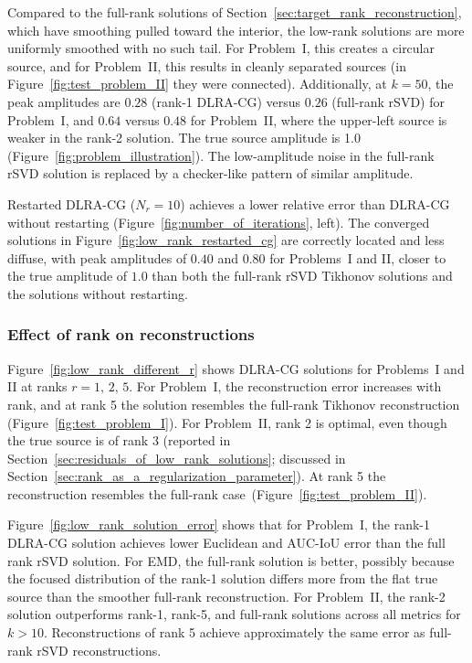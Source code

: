 Compared to the full-rank solutions of Section~\ref{sec:target_rank_reconstruction}, which have smoothing pulled toward the interior, the low-rank solutions are more uniformly smoothed with no such tail. For Problem~I, this creates a circular source, and for Problem~II, this results in cleanly separated sources (in Figure~\ref{fig:test_problem_II} they were connected). Additionally, at $k = 50$, the peak amplitudes are $0.28$ (rank-1 DLRA-CG) versus $0.26$ (full-rank rSVD) for Problem~I, and $0.64$ versus $0.48$ for Problem~II, where the upper-left source is weaker in the rank-2 solution. The true source amplitude is 1.0 (Figure~\ref{fig:problem_illustration}). The low-amplitude noise in the full-rank rSVD solution is replaced by a checker-like pattern of similar amplitude.

Restarted DLRA-CG ($N_r = 10$) achieves a lower relative error than DLRA-CG without restarting (Figure~\ref{fig:number_of_iterations}, left). The converged solutions in Figure~\ref{fig:low_rank_restarted_cg} are correctly located and less diffuse, with peak amplitudes of $0.40$ and $0.80$ for Problems~I and II, closer to the true amplitude of $1.0$ than both the full-rank rSVD Tikhonov solutions and the solutions without restarting.


\subsubsection{Effect of rank on reconstructions}\label{sec:effect_of_rank_on_reconstructions}


Figure~\ref{fig:low_rank_different_r} shows DLRA-CG solutions for Problems~I and II at ranks $r = 1,\, 2,\, 5$. For Problem~I, the reconstruction error increases with rank, and at rank 5 the solution resembles the full-rank Tikhonov reconstruction (Figure~\ref{fig:test_problem_I}). For Problem~II, rank 2 is optimal, even though the true source is of rank 3 (reported in Section~\ref{sec:residuals_of_low_rank_solutions}; discussed in Section~\ref{sec:rank_as_a_regularization_parameter}). At rank 5 the reconstruction resembles the full-rank case~(Figure~\ref{fig:test_problem_II}).

Figure~\ref{fig:low_rank_solution_error} shows that for Problem~I, the rank-1 DLRA-CG solution achieves lower Euclidean and AUC-IoU error than the full rank rSVD solution. For EMD, the full-rank solution is better, possibly because the focused distribution of the rank-1 solution differs more from the flat true source than the smoother full-rank reconstruction. For Problem~II, the rank-2 solution outperforms rank-1, rank-5, and full-rank solutions across all metrics for $k > 10$. Reconstructions of rank 5 achieve approximately the same error as full-rank rSVD reconstructions.

